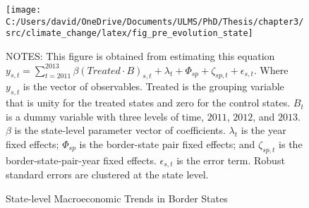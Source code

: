 \begin{figure}[H]
    \centering
    \texttt{[image: C:/Users/david/OneDrive/Documents/ULMS/PhD/Thesis/chapter3/src/climate\_change/latex/fig\_pre\_evolution\_state]}
    \caption{State-level Macroeconomic Trends in Border States}
    \label{fig:state-level-macroeconomic-trends-in-border-states}
    \begin{minipage}{14cm}
        \vspace{0.05in}
        \tiny NOTES: This figure is obtained from estimating this equation $y_{s,t} = \sum_{t = 2011}^{2013} \beta (Treated \cdot B)_{s,t} + \lambda_{t} + \Phi_{sp} + \zeta_{sp,t} + \epsilon_{s,t}$. Where $y_{s,t}$ is the vector of observables. Treated is the grouping variable that is unity for the treated states and zero for the control states. $B_{t}$ is a dummy variable with three levels of time, $2011$, $2012$, and $2013$. $\beta$ is the state-level parameter vector of coefficients. $\lambda_{t}$ is the year fixed effects; $\Phi_{sp}$ is the border-state pair fixed effects; and $\zeta_{sp,t}$ is the border-state-pair-year fixed effects. $\epsilon_{s,t}$ is the error term. Robust standard errors are clustered at the state level.
    \end{minipage}
\end{figure}